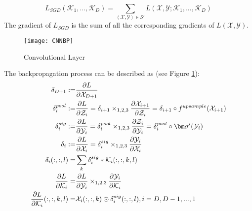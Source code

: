 \begin{equation}
L_{SGD}(\mathcal{K}_1,...,\mathcal{K}_D) = \sum_{(\mathcal{X},\mathcal{Y})\in S'} L(\mathcal{X},\mathcal{Y};\mathcal{K}_1,...,\mathcal{K}_D)
\end{equation}
The gradient of $L_{SGD}$ is the sum of all the corresponding gradients of $L(\mathcal{X},\mathcal{Y})$. 

\begin{figure}[ht]\label{fcnnbp}
\texttt{[image: CNNBP]}
\caption{Convolutional Layer}
\end{figure}

The backpropagation process can be described as (see Figure \ref{fcnnbp}):
\begin{equation}
\aligned
\delta_{D+1} :=& \frac{\partial L}{\partial \mathcal{X}_{D+1}}\\
\delta_i^{pool} :=&\frac{\partial L}{\partial \mathcal{Z}_i} = \delta_{i+1}\times_{1,2,3}\frac{\partial \mathcal{X}_{i+1}}{\partial \mathcal{Z}_i}=\delta_{i+1}\circ f^{upsample}(\mathcal{X}_{i+1})\\
\delta_i^{sig}:=&\frac{\partial L}{\partial \mathcal{Y}_i} = \delta_i^{pool}\times_{1,2,3}\frac{\partial \mathcal{Z}_i}{\partial \mathcal{Y}_i}=\delta_i^{pool}\circ\bm\sigma'(\mathcal{Y}_i)\\
\delta_i :=&\frac{\partial L}{\partial \mathcal{X}_i}= \delta_i^{sig}\times_{1,2,3}\frac{\partial \mathcal{Y}_i}{\partial \mathcal{X}_i}\\
\delta_i(:,:,l) =& \sum_k \delta_i^{sig}\ast\mathcal{K}_i(:,:,k,l)\\
\frac{\partial L}{\partial\mathcal{K}_i} =& \frac{\partial L}{\partial \mathcal{Y}_i}\times_{1,2,3}\frac{\partial \mathcal{Y}_i}{\partial \mathcal{K}_i}\\
\frac{\partial L}{\partial\mathcal{K}_i}(:,:,k,l) =& \mathcal{X}_i(:,:,k)\odot \delta_i^{sig}(:,:,l)
, i=D,D-1,...,1
\endaligned
\end{equation}


